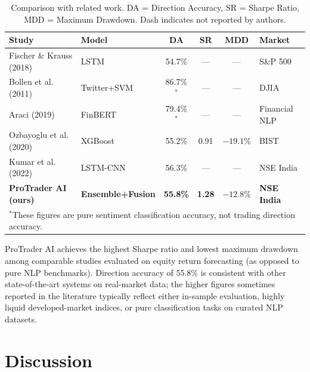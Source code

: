 \documentclass[10pt,a4paper,twoside]{article}
\begin{document}
\begin{table}[htb]
  \begin{center}
    {\caption{Comparison with related work. DA = Direction Accuracy, SR = Sharpe
    Ratio, MDD = Maximum Drawdown. Dash indicates not reported by
    authors.}\label{tab:comparison}}
    \begin{tabular}{|l|l|c|c|c|l|}
    \hline
    \textbf{Study} & \textbf{Model} & \textbf{DA} & \textbf{SR} & \textbf{MDD} & \textbf{Market} \\
    \hline
    Fischer \& Krauss (2018)~\cite{fischer2018} & LSTM & 54.7\% & --- & --- & S\&P 500 \\
    Bollen et al. (2011)~\cite{bollen2011} & Twitter+SVM & 86.7\%$^*$ & --- & --- & DJIA \\
    Araci (2019)~\cite{araci2019} & FinBERT & 79.4\%$^*$ & --- & --- & Financial NLP \\
    Ozbayoglu et al. (2020)~\cite{ozbayoglu2020} & XGBoost & 55.2\% & 0.91 & $-19.1\%$ & BIST \\
    Kumar et al. (2022)~\cite{kumar2022} & LSTM-CNN & 56.3\% & --- & --- & NSE India \\
    \textbf{ProTrader AI (ours)} & \textbf{Ensemble+Fusion} & \textbf{55.8\%} & \textbf{1.28} & \textbf{$-12.8\%$} & \textbf{NSE India} \\
    \hline
    \multicolumn{6}{l}{$^*$These figures are pure sentiment classification accuracy, not trading direction accuracy.} \\
    \hline
    \end{tabular}
  \end{center}
\end{table}

ProTrader AI achieves the highest Sharpe ratio and lowest maximum drawdown among
comparable studies evaluated on equity return forecasting (as opposed to pure
NLP benchmarks). Direction accuracy of 55.8\% is consistent with other
state-of-the-art systems on real-market data; the higher figures sometimes
reported in the literature typically reflect either in-sample evaluation, highly
liquid developed-market indices, or pure classification tasks on curated NLP
datasets.

\section{Discussion}
\end{document}
